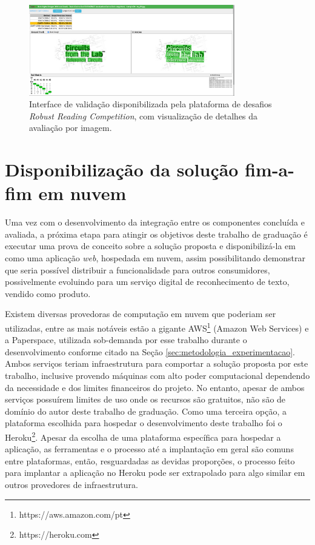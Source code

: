 \begin{figure}
    \centering
    \includegraphics[width=0.8\textwidth]{figs/metodologia-interface-validacao-detalhe.png}
    \caption{Interface de validação disponibilizada pela plataforma de desafios \textit{Robust Reading Competition}, com visualização de detalhes 
    da avaliação por imagem.}
    \label{fig:methodology_validation_interface_details}
\end{figure}

\section{Disponibilização da solução fim-a-fim em nuvem}\label{sec:methodology_cloud_deploy}
Uma vez com o desenvolvimento da integração entre os componentes concluída e avaliada, a próxima etapa para atingir os objetivos deste trabalho 
de graduação é executar uma prova de conceito sobre a solução proposta e disponibilizá-la em como uma aplicação \textit{web}, hospedada em nuvem, 
assim possibilitando demonstrar que seria possível distribuir a funcionalidade para outros consumidores, possivelmente evoluindo para um serviço 
digital de reconhecimento de texto, vendido como produto.

Existem diversas provedoras de computação em nuvem que poderiam ser utilizadas, entre as mais notáveis estão a gigante AWS\footnote{https://aws.amazon.com/pt} 
(Amazon Web Services) e a Paperspace, utilizada sob-demanda por esse trabalho durante o desenvolvimento conforme citado na Seção 
\ref{sec:metodologia_experimentacao}. Ambos serviços teriam infraestrutura para comportar a solução proposta por este trabalho, inclusive provendo 
máquinas com alto poder computacional dependendo da necessidade e dos limites financeiros do projeto. No entanto, apesar de ambos serviços possuírem 
limites de uso onde os recursos são gratuitos, não são de domínio do autor deste trabalho de graduação. Como uma terceira opção, a plataforma 
escolhida para hospedar o desenvolvimento deste trabalho foi o Heroku\footnote{https://heroku.com}. Apesar da escolha de uma plataforma específica 
para hospedar a aplicação, as ferramentas e o processo até a implantação em geral são comuns entre plataformas, então, resguardadas as devidas proporções, 
o processo feito para implantar a aplicação no Heroku pode ser extrapolado para algo similar em outros provedores de infraestrutura.

